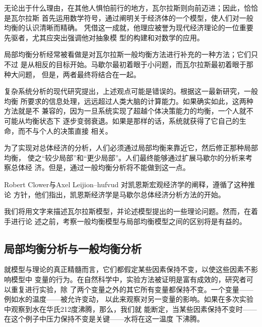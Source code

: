 无论出于什么理由，在其他人惧怕前行的地方，瓦尔拉斯则向前迈进；因此，恰恰是瓦尔拉斯
首先运用数学符号，通过阐明关于经济体的一个模型，使人们对一般均衡的认识清晰而精确。
凭借这一成就，他理应被誉为现代经济理论的一位重要先驱者，尤其应突出强调他对抽象模
型的构建和对数学的应用。

\begin{tcolorbox}[title = {瓦尔拉斯、马歇尔以及复杂性},
  fonttitle = \bfseries, fontupper = \small\itshape, fontlower =
  \small\itshape, left=20pt]
  \begin{multicols}{2}
    局部均衡分析经常被看做是对瓦尔拉斯一般均衡方法进行补充的一种方法；它们只不过
    是从相反的目标开始。马歇尔最初着眼于小问题，而瓦尔拉斯最初着眼于那种大问题，
    但是，两者最终将结合在一起。

    复杂系统分析的现代研究提出，上述观点可能是错误的。根据这一最新研究，一般均衡
    所要求的信息处理，远远超过人类大脑的计算能力。如果确实如此，这两种方法就是不
    兼容的，因为一旦系统实现了超越个体决策能力的均衡，一个人就不可能从均衡状态下
    逐步变弱衰退。如果是那样的话，系统就获得了它自己的生命，而不与个人的决策直接
    相关。

    为了实现对总体经济的分析，人们必须通过局部均衡来靠近它，然后修正那种局部均衡，
    使之“较少局部”和“更少局部”。人们最终能够通过扩展马歇尔的分析来考察总体经
    济。但是，通过一般均衡分析将不能做到这一点。

    Robert Clower与Axel Leijion--hufvud 对凯恩斯宏观经济学的阐释，遵循了这种推论
    方针，他们指出，凯恩斯经济学是马歇尔总体经济分析方法的开始。
  \end{multicols}
\end{tcolorbox}

我们将用文字来描述瓦尔拉斯模型，并论述模型提出的一些理论问题。然而，在着手进行论
述之前，考察一般均衡模型与局部均衡模型之间的区别将是有益的。


\subsection{局部均衡分析与一般均衡分析}

就模型与理论的真正精髓而言，它们都假定某些因素保持不变，以使这些因素不影响模型中
变量的行为。在自然科学中，实验方法被证明是富有成效的，研究者可以重复进行实验，除
了两个变量之外的其它所有变量都保持不变。一个变量——例如水的温度——被允许变动，
以此来观察对另一变量的影响。如果在多次实验中观察到水在华氏212度沸腾，那么，我们就
能断定，当某些因素保持不变时——在这个例子中压力保持不变是关键——水将在这一温度
下沸腾。

